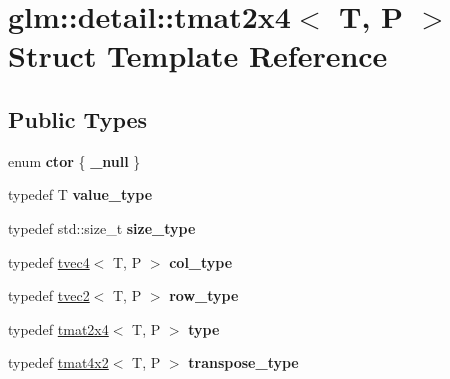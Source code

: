 \hypertarget{structglm_1_1detail_1_1tmat2x4}{}\section{glm\+:\+:detail\+:\+:tmat2x4$<$ T, P $>$ Struct Template Reference}
\label{structglm_1_1detail_1_1tmat2x4}
\subsection*{Public Types}
\begin{DoxyCompactItemize}
\item 
enum {\bfseries ctor} \{ {\bfseries \+\_\+null}
 \}\hypertarget{structglm_1_1detail_1_1tmat2x4_a3876cfcf80892580917b2b0417c22c24}{}\label{structglm_1_1detail_1_1tmat2x4_a3876cfcf80892580917b2b0417c22c24}

\item 
typedef T {\bfseries value\+\_\+type}\hypertarget{structglm_1_1detail_1_1tmat2x4_a4c650fe9e8b18e4b41fc8f6b3c5e0fb7}{}\label{structglm_1_1detail_1_1tmat2x4_a4c650fe9e8b18e4b41fc8f6b3c5e0fb7}

\item 
typedef std\+::size\+\_\+t {\bfseries size\+\_\+type}\hypertarget{structglm_1_1detail_1_1tmat2x4_a93a0c2fd19243d8fa55a0c45a740794d}{}\label{structglm_1_1detail_1_1tmat2x4_a93a0c2fd19243d8fa55a0c45a740794d}

\item 
typedef \hyperlink{structglm_1_1detail_1_1tvec4}{tvec4}$<$ T, P $>$ {\bfseries col\+\_\+type}\hypertarget{structglm_1_1detail_1_1tmat2x4_a7324a2efc8a0f59f538568015bdda76b}{}\label{structglm_1_1detail_1_1tmat2x4_a7324a2efc8a0f59f538568015bdda76b}

\item 
typedef \hyperlink{structglm_1_1detail_1_1tvec2}{tvec2}$<$ T, P $>$ {\bfseries row\+\_\+type}\hypertarget{structglm_1_1detail_1_1tmat2x4_a3048033664c24f3c2bb2f326f32a0654}{}\label{structglm_1_1detail_1_1tmat2x4_a3048033664c24f3c2bb2f326f32a0654}

\item 
typedef \hyperlink{structglm_1_1detail_1_1tmat2x4}{tmat2x4}$<$ T, P $>$ {\bfseries type}\hypertarget{structglm_1_1detail_1_1tmat2x4_a6e5bd72f58de7f3b40f3e9cf74df9b89}{}\label{structglm_1_1detail_1_1tmat2x4_a6e5bd72f58de7f3b40f3e9cf74df9b89}

\item 
typedef \hyperlink{structglm_1_1detail_1_1tmat4x2}{tmat4x2}$<$ T, P $>$ {\bfseries transpose\+\_\+type}\hypertarget{structglm_1_1detail_1_1tmat2x4_ad89bce74852aa9d53de6c2b780e7854f}{}\label{structglm_1_1detail_1_1tmat2x4_ad89bce74852aa9d53de6c2b780e7854f}

\end{DoxyCompactItemize}

